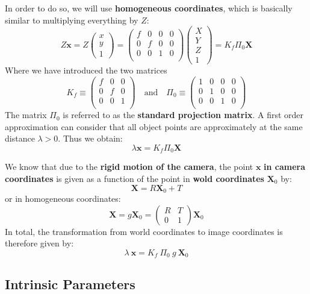 In order to do so, we will use \textbf{homogeneous coordinates},
which is basically similar to multiplying everything by $Z$:
\[ Z \bm{x} = Z \begin{pmatrix} x \\ y \\ 1 \end{pmatrix} =
	\begin{pmatrix}
		f & 0 & 0 & 0 \\
		0 & f & 0 & 0 \\
		0 & 0 & 1 & 0 \\
	\end{pmatrix}
	\begin{pmatrix}
		X \\ Y \\ Z \\ 1
	\end{pmatrix}
	= K_f \Pi_0 \bm{X}
\]
Where we have introduced the two matrices
\[K_f \equiv
	\begin{pmatrix}
		f & 0 & 0 \\
		0 & f & 0 \\
		0 & 0 & 1 \\
	\end{pmatrix}
	\quad \text{and} \quad
	\Pi_0 \equiv
	\begin{pmatrix}
		1 & 0 & 0 & 0 \\
		0 & 1 & 0 & 0 \\
		0 & 0 & 1 & 0 \\
	\end{pmatrix}
\]
The matrix $\Pi_0$ is referred to as the \textbf{standard projection matrix}.
A first order approximation can consider that all object points
are approximately at the same distance $\lambda > 0$. Thus we obtain:
\[\lambda \bm{x} = K_f \Pi_0 \bm{X}\]

We know that due to the \textbf{rigid motion of the camera},
the point $\bm{x}$ \textbf{in camera coordinates} is given as a function
of the point in \textbf{wold coordinates} $\bm{X}_0$ by:
\[\bm{X} = R \bm{X}_0 + T\]
or in homogeneous coordinates:
\[\bm{X} = g \bm{X}_0 = \begin{pmatrix}R & T \\ 0 & 1\end{pmatrix} \bm{X}_0\]
In total, the transformation from world coordinates to image coordinates
is therefore given by:
\[\boxed{\lambda\ \bm{x} = K_f\ \Pi_0\ g\ \bm{X}_0}\]


\subsection{Intrinsic Parameters}%
\label{sub:intrinsic_parameters}


